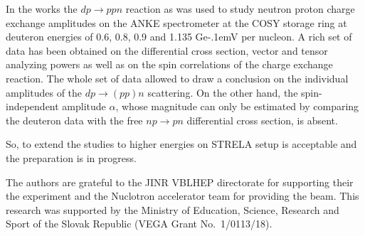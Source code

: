 \documentclass[twocolumn,epjc3]{svjour3}
\newcommand{\np}     {\ensuremath{np \rightarrow pn}\xspace}
\newcommand{\dpfrag} {\ensuremath{dp \rightarrow ppn}\xspace}
\newcommand{\dpchex} {\ensuremath{dp \rightarrow (pp)n}\xspace}
\newcommand{\GeV}    {Ge\kern-.1emV\xspace}
\providecommand{\DIFaddtex}[1]{{\protect\color{Green} \sf #1}} %
\providecommand{\DIFdeltex}[1]{{\protect\color{Red} \scriptsize #1}} %
\providecommand{\DIFaddbegin}{} %
\providecommand{\DIFaddend}{} %
\providecommand{\DIFdelbegin}{} %
\providecommand{\DIFdelend}{} %
\providecommand{\DIFadd}[1]{\texorpdfstring{\DIFaddtex{#1}}{#1}} %
\providecommand{\DIFdel}[1]{\texorpdfstring{\DIFdeltex{#1}}{}} %
\newcommand{\DIFscaledelfig}{0.5}
\newlength{\DIFdelgraphicswidth} %
\newlength{\DIFdelgraphicsheight} %
\newcommand{\DIFaddincludegraphics}[2][]{{\color{blue}\fbox{\DIFOincludegraphics[#1]{#2}}}} %
\newcommand{\DIFdelincludegraphics}[2][]{%
\sbox{\DIFdelgraphicsbox}{\DIFOincludegraphics[#1]{#2}}%
\settoboxwidth{\DIFdelgraphicswidth}{\DIFdelgraphicsbox} %
\settoboxtotalheight{\DIFdelgraphicsheight}{\DIFdelgraphicsbox} %
\scalebox{\DIFscaledelfig}{%
\parbox[b]{\DIFdelgraphicswidth}{\usebox{\DIFdelgraphicsbox}\\[-\baselineskip] \rule{\DIFdelgraphicswidth}{0em}}\llap{\resizebox{\DIFdelgraphicswidth}{\DIFdelgraphicsheight}{%
\setlength{\unitlength}{\DIFdelgraphicswidth}%
\begin{picture}(1,1)%
\thicklines\linethickness{2pt} %
{\color[rgb]{1,0,0}\put(0,0){\framebox(1,1){}}}%
{\color[rgb]{1,0,0}\put(0,0){\line( 1,1){1}}}%
{\color[rgb]{1,0,0}\put(0,1){\line(1,-1){1}}}%
\end{picture}%
}\hspace*{3pt}}} %
} %
\DeclareRobustCommand{\DIFaddbegin}{\DIFOaddbegin \let\includegraphics\DIFaddincludegraphics} %
\DeclareRobustCommand{\DIFaddend}{\DIFOaddend \let\includegraphics\DIFOincludegraphics} %
\DeclareRobustCommand{\DIFdelbegin}{\DIFOdelbegin \let\includegraphics\DIFdelincludegraphics} %
\DeclareRobustCommand{\DIFdelend}{\DIFOaddend \let\includegraphics\DIFOincludegraphics} %
\begin{document}
\DIFadd{In the works \cite{chi09,mch13} the }\dpfrag \DIFadd{reaction as was used to study
neutron proton charge exchange amplitudes on the ANKE spectrometer at the COSY
storage ring at deuteron energies of 0.6, 0.8, 0.9 and 1.135 }\GeV \DIFadd{per nucleon.
A rich set of data has been obtained on the differential cross section, vector
and tensor analyzing powers as well as on the spin correlations of the charge
exchange reaction. The whole set of data allowed to draw a conclusion on the
individual amplitudes of the }\dpchex \DIFadd{scattering. On the other hand, the
spin-independent amplitude $\alpha$, whose magnitude can only be estimated by
comparing the deuteron data with the free }\np \DIFadd{differential cross section, is
absent.
}

\DIFadd{So, to extend the studies to }\DIFaddend higher energies on STRELA setup is \DIFaddbegin \DIFadd{acceptable and
the preparation is }\DIFaddend in progress.

\begin{acknowledgements}
  The authors are grateful to the JINR VBLHEP directorate for supporting \DIFdelbegin \DIFdel{their
  }\DIFdelend \DIFaddbegin \DIFadd{the
  }\DIFaddend experiment and the Nuclotron accelerator team \DIFaddbegin \DIFadd{for providing the beam}\DIFaddend . This
  research was supported by the Ministry of Education, Science, Research and
  Sport of the Slovak Republic (VEGA Grant No.~1/0113/18).
\end{acknowledgements}
\end{document}
